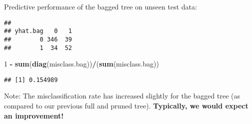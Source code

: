 \documentclass[10pt,ignorenonframetext,]{beamer}
\newenvironment{Shaded}{\begin{snugshade}}{\end{snugshade}}
\newcommand{\DataTypeTok}[1]{\textcolor[rgb]{0.13,0.29,0.53}{#1}}
\newcommand{\DecValTok}[1]{\textcolor[rgb]{0.00,0.00,0.81}{#1}}
\newcommand{\KeywordTok}[1]{\textcolor[rgb]{0.13,0.29,0.53}{\textbf{#1}}}
\newcommand{\NormalTok}[1]{#1}
\newcommand{\OperatorTok}[1]{\textcolor[rgb]{0.81,0.36,0.00}{\textbf{#1}}}
\newcommand{\StringTok}[1]{\textcolor[rgb]{0.31,0.60,0.02}{#1}}
\begin{document}
\begin{frame}[fragile]

Predictive performance of the bagged tree on unseen test data:

\vspace{2mm}

\scriptsize

\begin{Shaded}
\end{Shaded}

\begin{verbatim}
##         
## yhat.bag   0   1
##        0 346  39
##        1  34  52
\end{verbatim}

\begin{Shaded}
\begin{Highlighting}[]
\DecValTok{1} \OperatorTok{-}\StringTok{ }\KeywordTok{sum}\NormalTok{(}\KeywordTok{diag}\NormalTok{(misclass.bag))}\OperatorTok{/}\NormalTok{(}\KeywordTok{sum}\NormalTok{(misclass.bag))}
\end{Highlighting}
\end{Shaded}

\begin{verbatim}
## [1] 0.154989
\end{verbatim}

\normalsize

Note: The misclassification rate has increased slightly for the bagged
tree (as compared to our previous full and pruned tree).
\textbf{Typically, we would expect an improvement!}

\end{frame}
\end{document}
